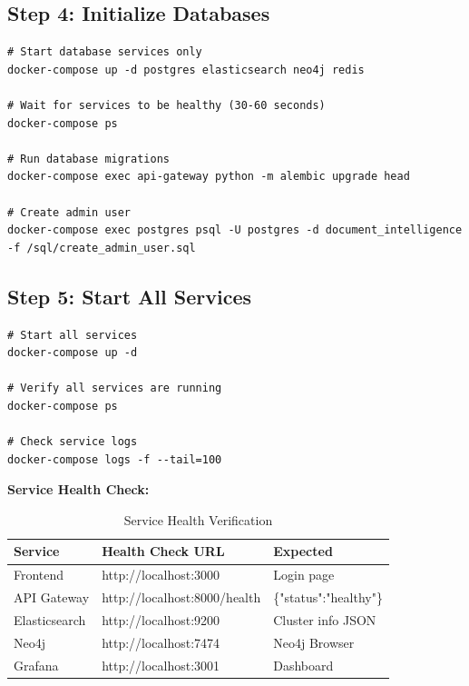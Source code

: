 \documentclass[11pt,a4paper,twoside]{book}
\begin{document}
\subsection{Step 4: Initialize Databases}

\begin{commandbox}
\begin{lstlisting}[style=bashstyle]
# Start database services only
docker-compose up -d postgres elasticsearch neo4j redis

# Wait for services to be healthy (30-60 seconds)
docker-compose ps

# Run database migrations
docker-compose exec api-gateway python -m alembic upgrade head

# Create admin user
docker-compose exec postgres psql -U postgres -d document_intelligence -f /sql/create_admin_user.sql
\end{lstlisting}
\end{commandbox}

\subsection{Step 5: Start All Services}

\begin{commandbox}
\begin{lstlisting}[style=bashstyle]
# Start all services
docker-compose up -d

# Verify all services are running
docker-compose ps

# Check service logs
docker-compose logs -f --tail=100
\end{lstlisting}
\end{commandbox}

\textbf{Service Health Check:}

\begin{table}[h]
\centering
\caption{Service Health Verification}
\begin{tabularx}{\textwidth}{lXl}
\toprule
\textbf{Service} & \textbf{Health Check URL} & \textbf{Expected} \\
\midrule
Frontend & http://localhost:3000 & Login page \\
API Gateway & http://localhost:8000/health & \{"status":"healthy"\} \\
Elasticsearch & http://localhost:9200 & Cluster info JSON \\
Neo4j & http://localhost:7474 & Neo4j Browser \\
Grafana & http://localhost:3001 & Dashboard \\
\bottomrule
\end{tabularx}
\end{table}
\end{document}

